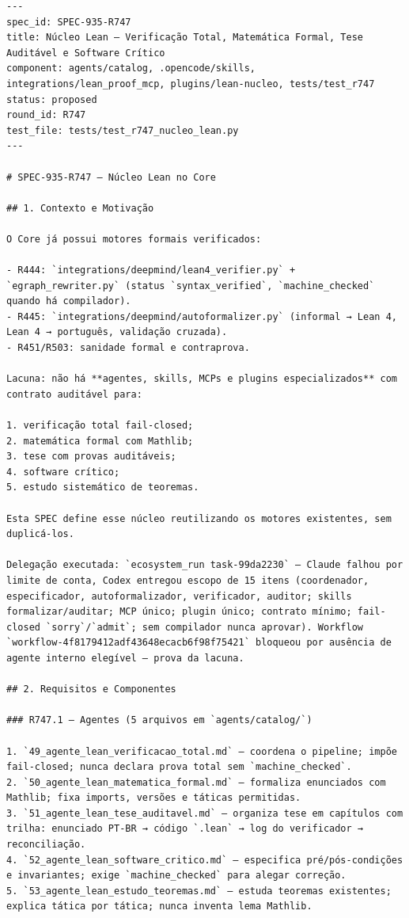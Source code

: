 \documentclass[12pt,openany,oneside,a4paper,brazil,chapter=TITLE]{abntex2}
\begin{document}
\begin{lstlisting}
---
spec_id: SPEC-935-R747
title: Núcleo Lean — Verificação Total, Matemática Formal, Tese Auditável e Software Crítico
component: agents/catalog, .opencode/skills, integrations/lean_proof_mcp, plugins/lean-nucleo, tests/test_r747
status: proposed
round_id: R747
test_file: tests/test_r747_nucleo_lean.py
---

# SPEC-935-R747 — Núcleo Lean no Core

## 1. Contexto e Motivação

O Core já possui motores formais verificados:

- R444: `integrations/deepmind/lean4_verifier.py` + `egraph_rewriter.py` (status `syntax_verified`, `machine_checked` quando há compilador).
- R445: `integrations/deepmind/autoformalizer.py` (informal → Lean 4, Lean 4 → português, validação cruzada).
- R451/R503: sanidade formal e contraprova.

Lacuna: não há **agentes, skills, MCPs e plugins especializados** com contrato auditável para:

1. verificação total fail-closed;
2. matemática formal com Mathlib;
3. tese com provas auditáveis;
4. software crítico;
5. estudo sistemático de teoremas.

Esta SPEC define esse núcleo reutilizando os motores existentes, sem duplicá-los.

Delegação executada: `ecosystem_run task-99da2230` — Claude falhou por limite de conta, Codex entregou escopo de 15 itens (coordenador, especificador, autoformalizador, verificador, auditor; skills formalizar/auditar; MCP único; plugin único; contrato mínimo; fail-closed `sorry`/`admit`; sem compilador nunca aprovar). Workflow `workflow-4f8179412adf43648ecacb6f98f75421` bloqueou por ausência de agente interno elegível — prova da lacuna.

## 2. Requisitos e Componentes

### R747.1 — Agentes (5 arquivos em `agents/catalog/`)

1. `49_agente_lean_verificacao_total.md` — coordena o pipeline; impõe fail-closed; nunca declara prova total sem `machine_checked`.
2. `50_agente_lean_matematica_formal.md` — formaliza enunciados com Mathlib; fixa imports, versões e táticas permitidas.
3. `51_agente_lean_tese_auditavel.md` — organiza tese em capítulos com trilha: enunciado PT-BR → código `.lean` → log do verificador → reconciliação.
4. `52_agente_lean_software_critico.md` — especifica pré/pós-condições e invariantes; exige `machine_checked` para alegar correção.
5. `53_agente_lean_estudo_teoremas.md` — estuda teoremas existentes; explica tática por tática; nunca inventa lema Mathlib.


\end{lstlisting}
\end{document}
